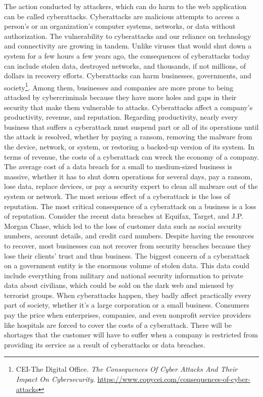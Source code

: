 The action conducted by attackers, which can do harm to the web application can be called cyberattacks. Cyberattacks are malicious attempts to access a person's or an organization's computer systems, networks, or data without authorization. The vulnerability to cyberattacks and our reliance on technology and connectivity are growing in tandem. Unlike viruses that would shut down a system for a few hours a few years ago, the consequences of cyberattacks today can include stolen data, destroyed networks, and thousands, if not millions, of dollars in recovery efforts. Cyberattacks can harm businesses, governments, and society\footnote{CEI-The Digital Office. \textit{The Consequences Of Cyber Attacks And Their Impact On Cybersecurity}. \url{https://www.copycei.com/consequences-of-cyber-attacks}}. Among them, businesses and companies are more prone to being attacked by cybercriminals because they have more holes and gaps in their security that make them vulnerable to attacks. Cyberattacks affect a company's productivity, revenue, and reputation. Regarding productivity, nearly every business that suffers a cyberattack must suspend part or all of its operations until the attack is resolved, whether by paying a ransom, removing the malware from the device, network, or system, or restoring a backed-up version of its system. In terms of revenue, the costs of a cyberattack can wreck the economy of a company. The average cost of a data breach for a small to medium-sized business is massive, whether it has to shut down operations for several days, pay a ransom, lose data, replace devices, or pay a security expert to clean all malware out of the system or network. The most serious effect of a cyberattack is the loss of reputation. The most critical consequence of a cyberattack on a business is a loss of reputation. Consider the recent data breaches at Equifax, Target, and J.P. Morgan Chase, which led to the loss of customer data such as social security numbers, account details, and credit card numbers. Despite having the resources to recover, most businesses can not recover from security breaches because they lose their clients' trust and thus business. The biggest concern of a cyberattack on a government entity is the enormous volume of stolen data. This data could include everything from military and national security information to private data about civilians, which could be sold on the dark web and misused by terrorist groups. When cyberattacks happen, they badly affect practically every part of society, whether it's a large corporation or a small business. Consumers pay the price when enterprises, companies, and even nonprofit service providers like hospitals are forced to cover the costs of a cyberattack. There will be shortages that the customer will have to suffer when a company is restricted from providing its service as a result of cyberattacks or data breaches.


